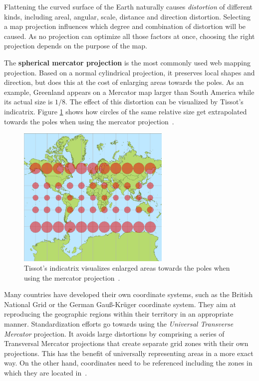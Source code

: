 Flattening the curved surface of the Earth naturally causes \textit{distortion} of different kinds, including areal, angular, scale, distance and direction distortion. Selecting a map projection influences which degree and combination of distortion will be caused. As no projection can optimize all those factors at once, choosing the right projection depends on the purpose of the map.

The \textbf{spherical mercator projection} is the most commonly used web mapping projection. Based on a normal cylindrical projection, it preserves local shapes and direction, but does this at the cost of enlarging areas towards the poles. As an example, Greenland appears on a Mercator map larger than South America while its actual size is $1/8$. The effect of this distortion can be visualized by Tissot's indicatrix. Figure \ref{fig:mercator} shows how circles of the same relative size get extrapolated towards the poles when using the mercator projection~\cite{Zzolo11mappingdrupal, wiki:web-mapping, Kupper2005lbs}. 

\begin{figure}[h]
  \begin{center}
    \includegraphics[width=0.65\textwidth]{figures/tissot_mercator.png}
    \caption{Tissot's indicatrix visualizes enlarged areas towards the poles when using the mercator projection~\cite{wiki:mercator}.}
    \label{fig:mercator}
  \end{center}
\end{figure}

Many countries have developed their own coordinate systems, such as the British National Grid or the German Gau\ss-Kr\"{u}ger coordinate system. They aim at reproducing the geographic regions within their territory in an appropriate manner. Standardization efforts go towards using the \textit{Universal Transverse Mercator} projection. It avoids large distortions by comprising a series of Transversal Mercator projections that create separate grid zones with their own projections. This has the benefit of universally representing areas in a more exact way. On the other hand, coordinates need to be referenced including the zones in which they are located in~\cite{Kupper2005lbs}.

